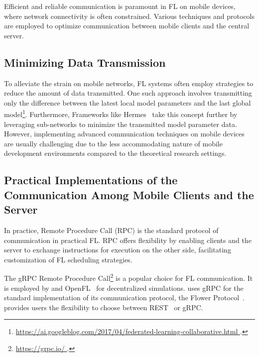 \documentclass[conference]{IEEEtran}
\begin{document}
\label{sec:communication}

Efficient and reliable communication is paramount in FL on mobile devices,
where network connectivity is often constrained.
Various techniques and protocols are employed to
optimize communication between mobile clients and the central server.

\subsection{Minimizing Data Transmission}

To alleviate the strain on mobile networks,
FL systems often employ strategies to reduce the amount of data transmitted.
One such approach involves transmitting only
the difference between the latest local model parameters and
the last global model\footnote{\url{
        https://ai.googleblog.com/2017/04/federated-learning-collaborative.html
}.}.
Furthermore,
Frameworks like Hermes~\cite{li2021hermes} take this concept further by
leveraging sub-networks to minimize the transmitted model parameter data.
However, implementing advanced communication techniques on mobile devices
are usually challenging due to the less accommodating nature of
mobile development environments compared to the theoretical research settings.

\subsection{Practical Implementations of the Communication Among Mobile Clients
    and the Server
}

In practice,
Remote Procedure Call (RPC) is the standard protocol of communication in
practical FL.
RPC offers flexibility by enabling clients and the server to
exchange instructions for execution on the other side,
facilitating customization of FL scheduling strategies.

The gRPC Remote Procedure Call\footnote{\url{
    https://grpc.io/
}.} is a popular choice for FL communication.
It is employed by \TFF{} and
OpenFL~\cite{patrick2022openfl} for decentralized simulations.
\Flower{} uses gRPC for the standard implementation of
its communication protocol, the Flower Protocol~\cite{beutel2020flower}.
\Florida{} provides users the flexibility to choose between
REST~\cite{Richards2006} or gRPC.
\end{document}
